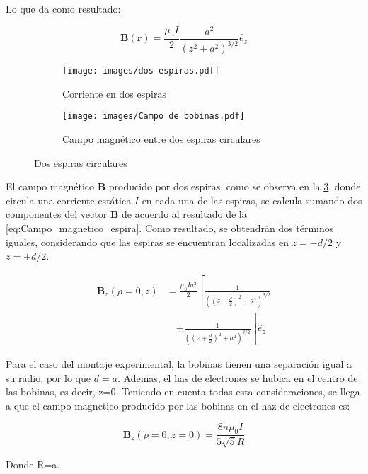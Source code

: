 Lo que da como resultado:

\begin{equation} 
    \mathbf{B}(\mathbf{r}) = \frac{\mu_{0}I}{2} \frac{a^{2}}{(z^{2}+a^{2})^{3/2}} \hat{e}_{z}
    \label{eq:Campo_magnetico_espira}
\end{equation} 

\begin{figure}[H]
    \centering
    \begin{subfigure}[a]{0.45\textwidth}
        \centering
        \texttt{[image: images/dos espiras.pdf]}
        \caption{Corriente en dos espiras}
        \label{fig:I_en_dos_espiras}
    \end{subfigure}
    \hfill
    \begin{subfigure}[b]{0.45\textwidth}
        \centering
        \texttt{[image: images/Campo de bobinas.pdf]}
        \caption{Campo magnético entre dos espiras circulares}
        \label{fig:CM_dos_espiras}
    \end{subfigure}
    \caption{Dos espiras circulares}
    \label{fig:dos_espiras}
\end{figure}

El campo magnético $\mathbf{B}$ producido por dos espiras, como se observa en la \cref{fig:dos_espiras}, donde circula una corriente estática $I$ en cada una de las espiras, se calcula sumando dos componentes del vector $\mathbf{B}$ de acuerdo al resultado de la \cref{eq:Campo_magnetico_espira}. Como resultado, se obtendrán dos términos iguales, considerando que las espiras se encuentran localizadas en $z = -d/2$ y $z = +d/2$.

\begin{equation}
\begin{aligned}
    \mathbf{B}_{z}(\rho=0,z) &= \frac{\mu_{0} I a^{2}}{2} \left[ \frac{1}{\left((z-\frac{d}{2})^{2} + a^{2}\right)^{3/2}} \right.\\
    &\quad \left.+ \frac{1}{\left((z+\frac{d}{2})^{2} + a^{2}\right)^{3/2}} \right] \hat{e}_{z}
    \label{Campo_magnetico_2espiras}
\end{aligned}
\end{equation}

Para el caso del montaje experimental, la bobinas tienen una separación igual a su radio, por lo que $d=a$. Ademas, el has de electrones 
se hubica en el centro de las bobinas, es decir, z=0. Teniendo en cuenta todas esta consideraciones, se llega a que el campo magnetico producido por las bobinas en el haz de electrones es: 

\begin{equation}
    \mathbf{B}_{z}(\rho=0,z=0)= \frac{8 n \mu_{0} I}{5 \sqrt{5} R}
    \label{Campo_magnetico_enHaz}
\end{equation}

Donde R=a.



